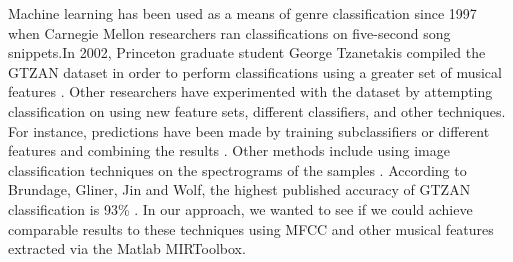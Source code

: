 Machine learning has been used as a means of genre classification since 1997 when Carnegie Mellon researchers ran classifications on five-second song snippets\cite{Dannenberg}.In 2002, Princeton graduate student George Tzanetakis compiled the GTZAN dataset in order to perform classifications using a greater set of musical features \cite{tzanetakis}. Other researchers have experimented with the dataset by attempting classification on using new feature sets, different classifiers, and other techniques. For instance, predictions have been made by training subclassifiers or different features and combining the results \cite{Hu}. Other methods include using image classification techniques on the spectrograms of the samples \cite{Wu}. According to Brundage, Gliner, Jin and Wolf, the highest published accuracy of GTZAN classification is 93\% \cite{sample}. In our approach, we wanted to see if we could achieve comparable results to these techniques using MFCC and other musical features extracted via the Matlab MIRToolbox\cite{MIR}. 